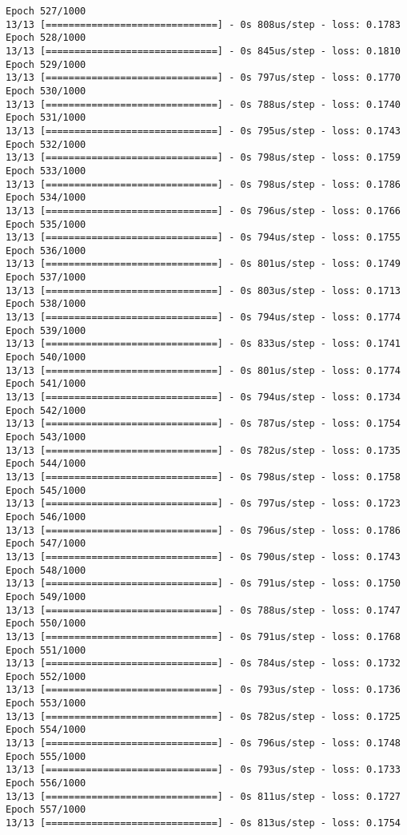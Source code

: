 \documentclass[11pt]{article}
\begin{document}
\begin{Verbatim}[commandchars=\\\{\}]
Epoch 527/1000
13/13 [==============================] - 0s 808us/step - loss: 0.1783
Epoch 528/1000
13/13 [==============================] - 0s 845us/step - loss: 0.1810
Epoch 529/1000
13/13 [==============================] - 0s 797us/step - loss: 0.1770
Epoch 530/1000
13/13 [==============================] - 0s 788us/step - loss: 0.1740
Epoch 531/1000
13/13 [==============================] - 0s 795us/step - loss: 0.1743
Epoch 532/1000
13/13 [==============================] - 0s 798us/step - loss: 0.1759
Epoch 533/1000
13/13 [==============================] - 0s 798us/step - loss: 0.1786
Epoch 534/1000
13/13 [==============================] - 0s 796us/step - loss: 0.1766
Epoch 535/1000
13/13 [==============================] - 0s 794us/step - loss: 0.1755
Epoch 536/1000
13/13 [==============================] - 0s 801us/step - loss: 0.1749
Epoch 537/1000
13/13 [==============================] - 0s 803us/step - loss: 0.1713
Epoch 538/1000
13/13 [==============================] - 0s 794us/step - loss: 0.1774
Epoch 539/1000
13/13 [==============================] - 0s 833us/step - loss: 0.1741
Epoch 540/1000
13/13 [==============================] - 0s 801us/step - loss: 0.1774
Epoch 541/1000
13/13 [==============================] - 0s 794us/step - loss: 0.1734
Epoch 542/1000
13/13 [==============================] - 0s 787us/step - loss: 0.1754
Epoch 543/1000
13/13 [==============================] - 0s 782us/step - loss: 0.1735
Epoch 544/1000
13/13 [==============================] - 0s 798us/step - loss: 0.1758
Epoch 545/1000
13/13 [==============================] - 0s 797us/step - loss: 0.1723
Epoch 546/1000
13/13 [==============================] - 0s 796us/step - loss: 0.1786
Epoch 547/1000
13/13 [==============================] - 0s 790us/step - loss: 0.1743
Epoch 548/1000
13/13 [==============================] - 0s 791us/step - loss: 0.1750
Epoch 549/1000
13/13 [==============================] - 0s 788us/step - loss: 0.1747
Epoch 550/1000
13/13 [==============================] - 0s 791us/step - loss: 0.1768
Epoch 551/1000
13/13 [==============================] - 0s 784us/step - loss: 0.1732
Epoch 552/1000
13/13 [==============================] - 0s 793us/step - loss: 0.1736
Epoch 553/1000
13/13 [==============================] - 0s 782us/step - loss: 0.1725
Epoch 554/1000
13/13 [==============================] - 0s 796us/step - loss: 0.1748
Epoch 555/1000
13/13 [==============================] - 0s 793us/step - loss: 0.1733
Epoch 556/1000
13/13 [==============================] - 0s 811us/step - loss: 0.1727
Epoch 557/1000
13/13 [==============================] - 0s 813us/step - loss: 0.1754

\end{Verbatim}
\end{document}

